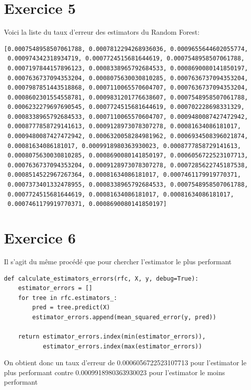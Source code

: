 \documentclass[a4paper, 12pt, oneside]{book}
\begin{document}
\section{Exercice 5}
Voici la liste du taux d'erreur des estimators du Random Forest:
\begin{verbatim}
[0.0007548958507061788, 0.0007812294268936036, 0.0009655644602055774, 
 0.000974342318934719, 0.0007724515681644619, 0.0007548958507061788, 
 0.0007197844157896123, 0.0008338965792684533, 0.0008690080141850197, 
 0.0007636737094353204, 0.0008075630030810285, 0.0007636737094353204,
 0.0007987851443518868, 0.0007110065570604707, 0.0007636737094353204, 
 0.0008602301554558781, 0.0009831201776638607, 0.0007548958507061788, 
 0.0006232279697690545, 0.0007724515681644619, 0.000702228698331329, 
 0.0008338965792684533, 0.0007110065570604707, 0.0009480087427472942, 
 0.0008777858729141613, 0.0009128973078307278, 0.00081634086181017, 
 0.0009480087427472942, 0.0006320058284981962, 0.0006934508396021874, 
 0.00081634086181017, 0.0009918980363930023, 0.0008777858729141613, 
 0.0008075630030810285, 0.0008690080141850197, 0.0006056722523107713,
 0.0007636737094353204, 0.0009128973078307278, 0.0007285622745187538, 
 0.0008514522967267364, 0.00081634086181017, 0.0007461179919770371, 
 0.0007373401332478955, 0.0008338965792684533, 0.0007548958507061788, 
 0.0007724515681644619, 0.00081634086181017, 0.00081634086181017, 
 0.0007461179919770371, 0.0008690080141850197]
\end{verbatim}



\section{Exercice 6}
Il s'agit du même procédé que pour chercher l'estimator le plus performant
\begin{verbatim}
def calculate_estimators_errors(rfc, X, y, debug=True):
    estimator_errors = []
    for tree in rfc.estimators_:
        pred = tree.predict(X)
        estimator_errors.append(mean_squared_error(y, pred))

    return estimator_errors.index(min(estimator_errors)),
           estimator_errors.index(max(estimator_errors))
\end{verbatim}
On obtient donc un taux d'erreur de 0.0006056722523107713 pour l'estimator le plus performant contre 0.0009918980363930023 pour l'estimator le moins performant
\end{document}
